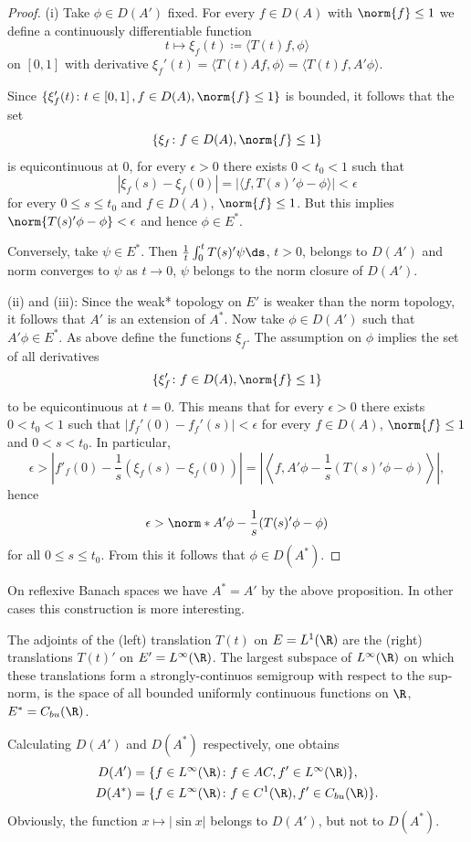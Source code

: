\begin{proof}
(i) Take $\phi \in D(A')$ fixed.
For every $f \in D(A)$ with $\norm{f} \leq 1$ we define a continuously differentiable function
\[
    t \mapsto \xi_{f}(t) \coloneqq \langle T(t)f,\phi \rangle
\]
on $\left[ 0,1 \right]$ with derivative $\xi_{f}'(t) = \langle T(t)Af,\phi \rangle = \langle T(t)f,A'\phi \rangle$.

Since $\{\xi_{f}'(t) \colon t \in \left[ 0,1 \right], f \in D(A), \norm{f} \leq 1\}$ is bounded, it follows that the set
\[
    \{\xi_{f} \colon f \in D(A), \norm{f} \leq 1\}
\]
is equicontinuous at $0$, \ie for every $\epsilon > 0$ there exists $0 < t_{0} < 1$ such that
\[
    |\xi_{f}(s) - \xi_{f}(0)| = |\langle f,T(s)'\phi - \phi \rangle| < \epsilon
\]
for every $0 \leq s \leq t_{0}$ and $f \in D(A)$, $\norm{f} \leq 1$.
But this implies $\norm{T(s)'\phi - \phi} < \epsilon$ and hence $\phi \in E^{*}$.

Conversely, take $\psi \in E^{*}$.
Then $\frac{1}{t}\int_{0}^{t} T(s)'\psi \ds$, $t > 0$, belongs to $D(A')$ and norm converges to $\psi$ as $t \to 0$, \ie $\psi$ belongs to the norm closure of\/ $D(A')$.

(ii) and (iii): Since the weak* topology on $E'$ is weaker than the norm topology, it follows that $A'$ is an extension of\/ $A^{*}$.
Now take $\phi \in D(A')$ such that $A'\phi \in E^{*}$.
As above define the functions $\xi_{f}$. 
The assumption on $\phi$ implies the set of all derivatives
\[
\{\xi_{f}' \colon f \in D(A), \norm{f} \leq 1\}
\]
to be equicontinuous at $t = 0$. 
This means that for every $\epsilon > 0$ there exists $0 < t_{0} < 1$ such that $|f_f'(0) - f_f'(s)| < \epsilon$ for every $f \in D(A)$, $\norm{f} \leq 1$ and $0 < s < t_{0}$.
In particular,
\[
    \epsilon > \left\lvert f'_f(0) - \frac{1}{s}(\xi_f(s)-\xi_f(0)) \right\rvert 
    = \left\lvert \left\langle f,A'\phi - \frac{1}{s}(T(s)'\phi-\phi) \right\rangle \right\rvert ,
\]
hence
\[
    \epsilon > \norm*{A'\phi - \frac{1}{s}(T(s)'\phi-\phi) }
\]
for all $0 \leq s \leq t_{0}$.
From this it follows that $\phi \in D(A^*)$.
\end{proof}
On reflexive Banach spaces we have $A^* = A'$ by the above proposition.
In other cases this construction is more interesting.
\begin{example*}[continued]\label{ex:a1-3.4}
The adjoints of the (left) translation $T(t)$ on $E = L^1(\R)$ are the (right) translations $T(t)'$ on $E' = L^\infty(\R)$.
The largest subspace of\/ $L^\infty(\R)$ on which these translations form a strongly-continuos semigroup with respect to the sup-norm, is the space of all bounded uniformly continuous functions on $\R$, \ie $E^* = C_{bu}(\R)$.

Calculating $D(A')$ and $D(A^*)$ respectively, one obtains
\begin{align*}
    D(A') &= \{f \in L^\infty(\R) \colon f \in AC, f' \in L^\infty(\R)\}, \\
    D(A^*) &= \{f \in L^\infty(\R) \colon f \in C^1(\R), f' \in C_{bu}(\R)\}.
\end{align*}
Obviously, the function $x \mapsto |\sin x|$ belongs to $D(A')$, but not to $D(A^*)$.
\end{example*}
